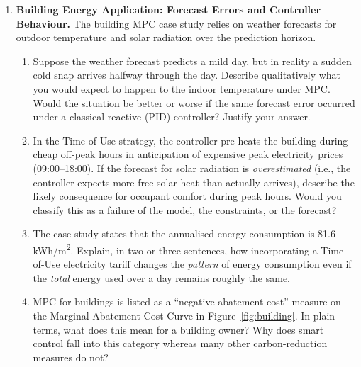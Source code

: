 \begin{enumerate}
	\item \textbf{Building Energy Application: Forecast Errors and Controller Behaviour.}
	The building MPC case study relies on weather forecasts for outdoor temperature and solar radiation over the prediction horizon.
	\begin{enumerate}
		\item[(a)] Suppose the weather forecast predicts a mild day, but in reality a sudden cold snap arrives halfway through the day. Describe qualitatively what you would expect to happen to the indoor temperature under MPC. Would the situation be better or worse if the same forecast error occurred under a classical reactive (PID) controller? Justify your answer.
		\item[(b)] In the Time-of-Use strategy, the controller pre-heats the building during cheap off-peak hours in anticipation of expensive peak electricity prices (09:00--18:00). If the forecast for solar radiation is \emph{overestimated} (i.e., the controller expects more free solar heat than actually arrives), describe the likely consequence for occupant comfort during peak hours. Would you classify this as a failure of the model, the constraints, or the forecast?
		\item[(c)] The case study states that the annualised energy consumption is 81.6 kWh/m\textsuperscript{2}. Explain, in two or three sentences, how incorporating a Time-of-Use electricity tariff changes the \emph{pattern} of energy consumption even if the \emph{total} energy used over a day remains roughly the same.
		\item[(d)] MPC for buildings is listed as a ``negative abatement cost'' measure on the Marginal Abatement Cost Curve in Figure~\ref{fig:building}. In plain terms, what does this mean for a building owner? Why does smart control fall into this category whereas many other carbon-reduction measures do not?
	\end{enumerate}

\end{enumerate}



